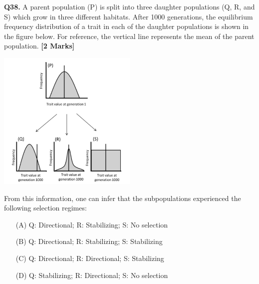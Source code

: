 \documentclass[11pt]{article}
\newcommand{\questionb}[2]{
    \noindent\textbf{Q#2.} #1 \hfill \textbf{[2 Marks]}
}
\begin{document}
\questionb{A parent population (P) is split into three daughter populations (Q, R, and S) which grow in three different habitats. After 1000 generations, the equilibrium frequency distribution of a trait in each of the daughter populations is shown in the figure below. For reference, the vertical line represents the mean of the parent population.}{38}
\begin{center}
\includegraphics[width=0.5\textwidth]{figures/38}
\end{center}
From this information, one can infer that the subpopulations experienced the following selection regimes:
\begin{enumerate}
    \item[(A)] Q: Directional; R: Stabilizing; S: No selection
    \item[(B)] Q: Directional; R: Stabilizing; S: Stabilizing
    \item[(C)] Q: Directional; R: Directional; S: Stabilizing
    \item[(D)] Q: Stabilizing; R: Directional; S: No selection
\end{enumerate}
\vspace{0.5cm}
\end{document}
